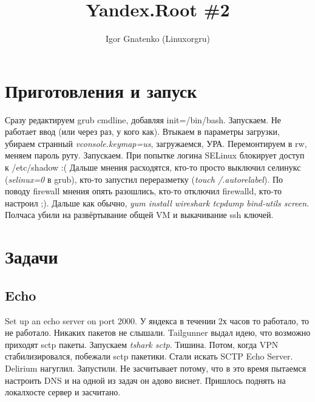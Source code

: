 \documentclass[a4paper,10pt]{report}
\title{Yandex.Root \#2}
\author{Igor Gnatenko (Linuxorgru)}
\begin{document}
\maketitle
\tableofcontents

\begin{abstract}
\end{abstract}

\part{Приготовления и запуск}

Сразу редактируем grub cmdline, добавляя init=/bin/bash. Запускаем. Не работает ввод (или через раз, у кого как).
Втыкаем в параметры загрузки, убираем странный \textit{vconsole.keymap=us}, загружаемся, УРА. Перемонтируем в rw,
меняем пароль руту. Запускаем. При попытке логина SELinux блокирует доступ к /etc/shadow :( Дальше мнения расходятся,
кто-то просто выключил селинукс (\textit{selinux=0} в grub), кто-то запустил переразметку (\textit{touch /.autorelabel}).
По поводу firewall мнения опять разошлись, кто-то отключил firewalld, кто-то настроил ;).
\newline
Дальше как обычно, \textit{yum install wireshark tcpdump bind-utils screen}.
\newline
Полчаса убили на развёртывание общей VM и выкачивание ssh ключей.

\part{Задачи}

\chapter{Echo}
Set up an echo server on port 2000.
\newline\newline
У яндекса в течении 2х часов то работало, то не работало. Никаких пакетов не слышали. Tailgunner выдал идею, что возможно
приходят sctp пакеты. Запускаем \textit{tshark sctp}. Тишина. Потом, когда VPN стабилизировался, побежали sctp пакетики.
Стали искать SCTP Echo Server. Delirium нагуглил. Запустили. Не засчитывает потому, что в это время пытаемся настроить
DNS и на одной из задач он адово виснет. Пришлось поднять на локалхосте сервер и засчитано.
\end{document}
